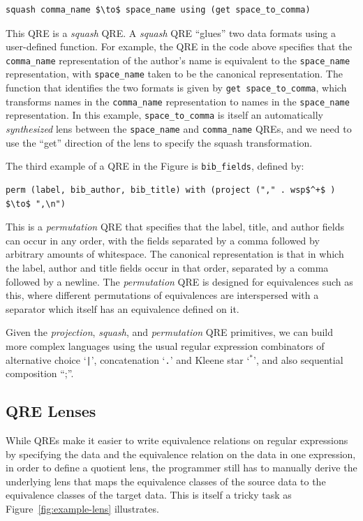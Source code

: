 \documentclass[acmsmall,review,anonymous]{acmart}\settopmatter{printfolios=true,printccs=false,printacmref=false}
\newcommand{\cd}[1]{\lstinline[backgroundcolor=\color{white}]$#1$}
\begin{document}
\begin{center}
\begin{lstlisting}
squash comma_name $\to$ space_name using (get space_to_comma)
\end{lstlisting}
\end{center}

\noindent This QRE is a \textit{squash} QRE. A \textit{squash} QRE ``glues''
two data formats using a user-defined function. For example,
the QRE in the code above specifies that the \cd{comma_name} representation of
the author's name is equivalent to the \cd{space_name} representation, with
\cd{space_name} taken to be the canonical representation. The
function that identifies the two formats is given by \cd{get space_to_comma},
which transforms names in the \cd{comma_name} representation to names in the
\cd{space_name} representation. In this example, \cd{space_to_comma} is itself
an automatically \textit{synthesized} lens between the \cd{space_name} and
\cd{comma_name} QREs, and we need to use the ``get'' direction of the lens to
specify the squash transformation.

The third example of a QRE in the Figure is \cd{bib_fields}, defined by:
\begin{center}
\begin{lstlisting}
perm (label, bib_author, bib_title) with (project ("," . wsp$^+$ ) $\to$ ",\n")
\end{lstlisting}
\end{center}

\noindent This is a \textit{permutation} QRE that specifies that the label,
title, and author fields can occur in any order, with the fields separated by a
comma followed by arbitrary amounts of whitespace. The canonical representation
is that in which the label, author and title fields occur in that order,
separated by a comma followed by a newline. The \textit{permutation} QRE is
designed for equivalences such as this, where different permutations of
equivalences are interspersed with a separator which itself has an
equivalence defined on it.

Given the \textit{projection}, \textit{squash}, and \textit{permutation}
QRE primitives, we can build more complex languages using the usual regular
expression combinators of alternative choice `\cd{|}', concatenation `\cd{.}'
and Kleene star `$^*$', and also sequential composition ``;''.

\subsection{QRE Lenses}
While QREs make it easier to write equivalence relations on regular expressions
by specifying the data and the equivalence relation on the data in one
expression, in order to define a quotient lens, the programmer still has to
manually derive the underlying lens that maps the equivalence classes of the
source data to the equivalence classes of the target data. This is itself a
tricky task as Figure~\ref{fig:example-lens} illustrates.
\end{document}
